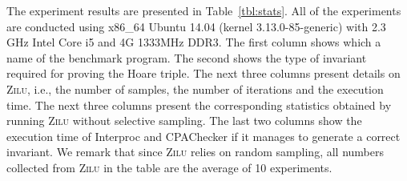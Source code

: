 The experiment results are presented in Table~\ref{tbl:stats}. All of the experiments are conducted using x86\_64 Ubuntu 14.04 (kernel 3.13.0-85-generic) with 2.3 GHz Intel Core i5 and 4G 1333MHz DDR3.
The first column shows which a name of the benchmark program. The second shows the type of invariant required for proving the Hoare triple. The next three columns present details on \textsc{Zilu}, i.e., the number of samples, the number of iterations and the execution time. The next three columns present the corresponding statistics obtained by running \textsc{Zilu} without selective sampling. The last two columns show the execution time of Interproc and CPAChecker if it manages to generate a correct invariant.
We remark that since \textsc{Zilu} relies on random sampling, all numbers collected from \textsc{Zilu} in the table are the average of 10 experiments.

